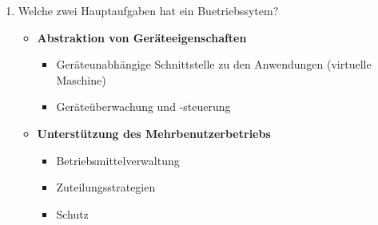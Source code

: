 \documentclass[12pt,a4paper,ngerman]{scrartcl}
\newcommand{\crucial}[1]{ \textbf{\textcolor{hl}{#1} }}
\begin{document}
\begin{enumerate}
\item Welche zwei Hauptaufgaben hat ein Buetriebssytem? \\

\begin{itemize}
\item \crucial{Abstraktion von Geräteeigenschaften}
	\begin{itemize}
		\item Geräteunabhängige Schnittstelle zu den Anwendungen (virtuelle Maschine)
		\item Geräteüberwachung und -steuerung
	\end{itemize}

\item \crucial{Unterstützung des Mehrbenutzerbetriebs}
	\begin{itemize}
		\item Betriebsmittelverwaltung
		\item Zuteilungsstrategien
		\item Schutz
	\end{itemize}
\end{itemize}



\end{enumerate}
\end{document}

